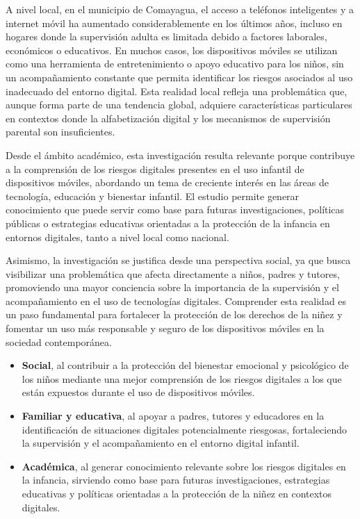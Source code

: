 A nivel local, en el municipio de Comayagua, el acceso a teléfonos inteligentes y a internet móvil ha aumentado considerablemente en los últimos años, incluso en hogares donde la supervisión adulta es limitada debido a factores laborales, económicos o educativos. En muchos casos, los dispositivos móviles se utilizan como una herramienta de entretenimiento o apoyo educativo para los niños, sin un acompañamiento constante que permita identificar los riesgos asociados al uso inadecuado del entorno digital. Esta realidad local refleja una problemática que, aunque forma parte de una tendencia global, adquiere características particulares en contextos donde la alfabetización digital y los mecanismos de supervisión parental son insuficientes.

Desde el ámbito académico, esta investigación resulta relevante porque contribuye a la comprensión de los riesgos digitales presentes en el uso infantil de dispositivos móviles, abordando un tema de creciente interés en las áreas de tecnología, educación y bienestar infantil. El estudio permite generar conocimiento que puede servir como base para futuras investigaciones, políticas públicas o estrategias educativas orientadas a la protección de la infancia en entornos digitales, tanto a nivel local como nacional.

Asimismo, la investigación se justifica desde una perspectiva social, ya que busca visibilizar una problemática que afecta directamente a niños, padres y tutores, promoviendo una mayor conciencia sobre la importancia de la supervisión y el acompañamiento en el uso de tecnologías digitales. Comprender esta realidad es un paso fundamental para fortalecer la protección de los derechos de la niñez y fomentar un uso más responsable y seguro de los dispositivos móviles en la sociedad contemporánea.
\begin{itemize}
    \item \textbf{Social}, al contribuir a la protección del bienestar emocional y psicológico de los niños mediante una mejor comprensión de los riesgos digitales a los que están expuestos durante el uso de dispositivos móviles.
    
    \item \textbf{Familiar y educativa}, al apoyar a padres, tutores y educadores en la identificación de situaciones digitales potencialmente riesgosas, fortaleciendo la supervisión y el acompañamiento en el entorno digital infantil.
    
    \item \textbf{Académica}, al generar conocimiento relevante sobre los riesgos digitales en la infancia, sirviendo como base para futuras investigaciones, estrategias educativas y políticas orientadas a la protección de la niñez en contextos digitales.
\end{itemize}

